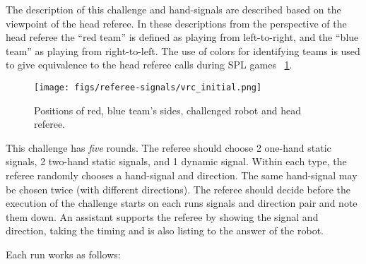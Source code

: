 The description of this challenge and hand-signals are described based on the viewpoint of the head referee. In these descriptions from the perspective of the head referee the ``red team'' is defined as playing from left-to-right, and the ``blue team'' as playing from right-to-left. The use of colors for identifying teams is used to give equivalence to the head referee calls during SPL games \cf~\cref{fig:visual_referee_inital_positions}.

\begin{figure}[ht!]
    \begin{center}
        \leavevmode
        \texttt{[image: figs/referee-signals/vrc\_initial.png]}
        \caption{Positions of {\color{red}red}, {\color{blue}blue} team's sides, challenged robot and head referee.}
        \label{fig:visual_referee_inital_positions}
    \end{center}
\end{figure}

This challenge has \textit{five} rounds. The referee should choose 2 one-hand static signals, 2 two-hand static signals, and 1 dynamic signal. Within each type, the referee randomly chooses a hand-signal and direction. The same hand-signal may be chosen twice (with different directions). The referee should decide before the execution of the challenge starts on each runs signals and direction pair and note them down. An assistant supports the referee by showing the signal and direction, taking the timing and is also listing to the answer of the robot.

Each run works as follows:


